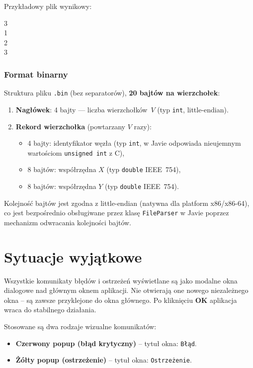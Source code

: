 \documentclass[a4paper, 11pt]{article}
\begin{document}
Przykładowy plik wynikowy:
\begin{filebox}
3\\
1  \\
2  \\
3  
\end{filebox}

\subsubsection{Format binarny}

Struktura pliku \texttt{.bin} (bez separatorów), \textbf{20 bajtów na wierzchołek}:

\begin{enumerate}
  \item \textbf{Nagłówek}: 4 bajty --- liczba wierzchołków~$V$ (typ \texttt{int}, little-endian).
  \item \textbf{Rekord wierzchołka} (powtarzany $V$ razy):
  \begin{itemize}
    \item 4 bajty: identyfikator węzła (typ \texttt{int}, w Javie odpowiada nieujemnym wartościom \texttt{unsigned int} z C),
    \item 8 bajtów: współrzędna $X$ (typ \texttt{double} IEEE~754),
    \item 8 bajtów: współrzędna $Y$ (typ \texttt{double} IEEE~754).
  \end{itemize}
\end{enumerate}

Kolejność bajtów jest zgodna z little-endian (natywna dla platform x86/x86-64), co jest bezpośrednio obsługiwane przez klasę \texttt{FileParser} w Javie poprzez mechanizm odwracania kolejności bajtów.

\section{Sytuacje wyjątkowe}

Wszystkie komunikaty błędów i ostrzeżeń wyświetlane są jako modalne okna dialogowe nad głównym oknem aplikacji. Nie otwierają one nowego niezależnego okna – są zawsze przyklejone do okna głównego. Po kliknięciu \textbf{OK} aplikacja wraca do stabilnego działania.

Stosowane są dwa rodzaje wizualne komunikatów:
\begin{itemize}
  \item \textbf{Czerwony popup (błąd krytyczny)} – tytuł okna: \texttt{Błąd}.
  \item \textbf{Żółty popup (ostrzeżenie)} – tytuł okna: \texttt{Ostrzeżenie}.
\end{itemize}
\end{document}
